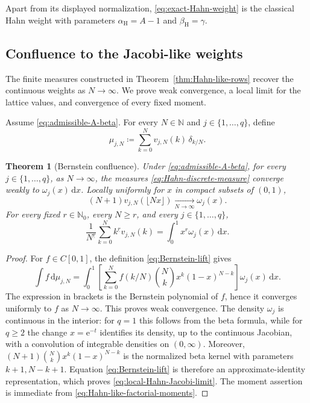 \documentclass[10pt]{amsart}
\newcommand{\N}{\mathbb N}
\newcommand{\Nzero}{\mathbb N_0}
\newcommand{\e}{\mathrm e}
\newcommand{\dd}{\,\mathrm d}
\newcommand{\fall}[2]{#1^{\underline{#2}}}
\theoremstyle{plain}
\newtheorem{theorem}{Theorem}[section]
\theoremstyle{definition}
\theoremstyle{remark}
\begin{document}
Apart from its displayed normalization, \eqref{eq:exact-Hahn-weight} is
the classical Hahn weight with parameters \(\alpha_{\mathrm H}=A-1\) and
\(\beta_{\mathrm H}=\gamma\).

\subsection{Confluence to the Jacobi-like weights}

The finite measures constructed in Theorem~\ref{thm:Hahn-like-rows}
recover the continuous weights as \(N\to\infty\). We prove weak
convergence, a local limit for the lattice values, and convergence of
every fixed moment.

Assume \eqref{eq:admissible-A-beta}. For every \(N\in\N\) and
\(j\in\{1,\ldots,q\}\), define
\begin{equation}
 \mu_{j,N}\coloneq\sum_{k=0}^Nv_{j,N}(k)\,\delta_{k/N}.
 \label{eq:Hahn-discrete-measure}
\end{equation}

\begin{theorem}[Bernstein confluence]
\label{thm:Hahn-to-Jacobi-rows}
Under \eqref{eq:admissible-A-beta}, for every
\(j\in\{1,\ldots,q\}\), as \(N\to\infty\), the measures
\eqref{eq:Hahn-discrete-measure} converge weakly to
\(\omega_j(x)\dd x\). Locally uniformly for \(x\) in
compact subsets of \((0,1)\),
\begin{equation}
 (N+1)v_{j,N}(\lfloor Nx\rfloor)
 \xrightarrow[N\to\infty]{}\omega_j(x).
 \label{eq:local-Hahn-Jacobi-limit}
\end{equation}
For every fixed \(r\in\Nzero\), every \(N\ge r\), and every
\(j\in\{1,\ldots,q\}\),
\[
 \frac{1}{\fall{N}{r}}
 \sum_{k=0}^N\fall{k}{r}v_{j,N}(k)
 =\int_0^1x^r\omega_j(x)\dd x.
\]
\end{theorem}

\begin{proof}
For \(f\in C[0,1]\), the definition \eqref{eq:Bernstein-lift} gives
\[
 \int f\dd\mu_{j,N}
 =\int_0^1\left[\sum_{k=0}^Nf(k/N)\binom Nk
 x^k(1-x)^{N-k}\right]\omega_j(x)\dd x.
\]
The expression in brackets is the Bernstein polynomial of \(f\), hence it
converges uniformly to \(f\) as \(N\to\infty\). This proves weak convergence. The density
\(\omega_j\) is continuous in the interior: for \(q=1\) this follows from
the beta formula, while for \(q\ge2\) the change \(x=\e^{-t}\) identifies
its density, up to the continuous Jacobian, with a convolution of
integrable densities on \((0,\infty)\). Moreover,
\((N+1)\binom Nkx^k(1-x)^{N-k}\) is the normalized beta kernel with parameters
\(k+1,N-k+1\). Equation \eqref{eq:Bernstein-lift} is therefore an
approximate-identity representation, which proves
\eqref{eq:local-Hahn-Jacobi-limit}. The moment assertion is immediate
from \eqref{eq:Hahn-like-factorial-moments}.
\end{proof}
\end{document}
